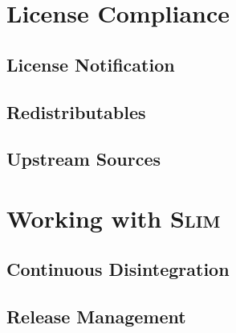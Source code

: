\documentclass[a4paper,10pt]{article}
\newcommand{\slim}{\textsc{Slim}\xspace}
\begin{document}
\section{License Compliance}
\subsection{License Notification}
\subsection{Redistributables}
\subsection{Upstream Sources}

\section{Working with \slim}
\subsection{Continuous Disintegration}
\subsection{Release Management}



\end{document}
